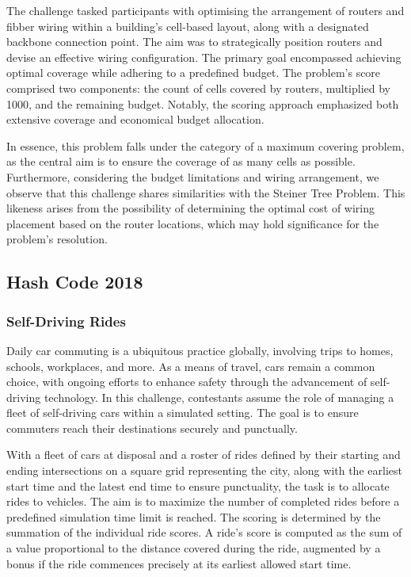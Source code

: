 The challenge tasked participants with optimising the arrangement of routers and
fibber wiring within a building's cell-based layout, along with a designated
backbone connection point. The aim was to strategically position routers and
devise an effective wiring configuration. The primary goal encompassed achieving
optimal coverage while adhering to a predefined budget. The problem's score
comprised two components: the count of cells covered by routers, multiplied by
1000, and the remaining budget. Notably, the scoring approach emphasized both
extensive coverage and economical budget allocation.

In essence, this problem falls under the category of a maximum covering problem,
as the central aim is to ensure the coverage of as many cells as possible.
Furthermore, considering the budget limitations and wiring arrangement, we
observe that this challenge shares similarities with the Steiner Tree Problem.
This likeness arises from the possibility of determining the optimal cost of
wiring placement based on the router locations, which may hold significance for the
problem's resolution.

\subsection{Hash Code 2018}
\label{subsec:hashcode-2018}

\subsubsection*{Self-Driving Rides}
\label{subsubsec:hashcode-2018-qualification}

Daily car commuting is a ubiquitous practice globally, involving trips to homes,
schools, workplaces, and more. As a means of travel, cars remain a common
choice, with ongoing efforts to enhance safety through the advancement of
self-driving technology. In this challenge, contestants assume the role of
managing a fleet of self-driving cars within a simulated setting. The goal is to
ensure commuters reach their destinations securely and punctually.

With a fleet of cars at disposal and a roster of rides defined by their starting
and ending intersections on a square grid representing the city, along with the
earliest start time and the latest end time to ensure punctuality, the task is
to allocate rides to vehicles. The aim is to maximize the number of completed
rides before a predefined simulation time limit is reached. The scoring is
determined by the summation of the individual ride scores. A ride's score is
computed as the sum of a value proportional to the distance covered during the
ride, augmented by a bonus if the ride commences precisely at its earliest
allowed start time.


